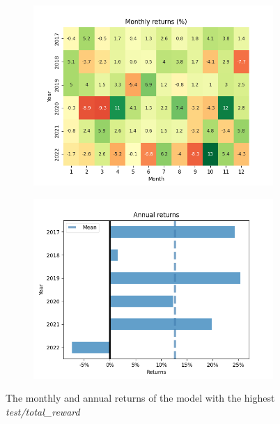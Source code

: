 \documentclass[../xlapes02]{subfiles}
\begin{document}
    \begin{figure}[H]
        \centering
        \begin{subfigure}[t]{\experimentimgwidth\textwidth}
            \centering
            \includegraphics[width=\linewidth]{image/figure/monthly_returns_heatmap_max}
        \end{subfigure}
        \hfill
        \begin{subfigure}[t]{\experimentimgwidth\textwidth}
            \centering
            \includegraphics[width=\linewidth]{image/figure/annual_returns_max}
        \end{subfigure}
        \caption{The monthly and annual returns of the model with the highest \emph{test/total\_reward}}
        \label{fig:month_annual_returns_max}
    \end{figure}
\end{document}
